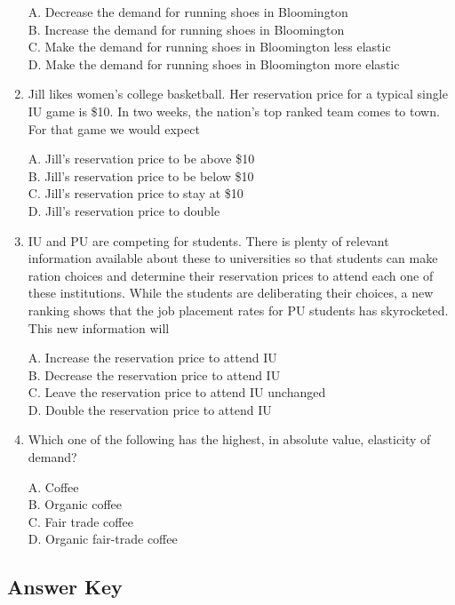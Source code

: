 \documentclass[
]{book}
\begin{document}
\begin{enumerate}
  A. Decrease the demand for running shoes in Bloomington\\
  B. Increase the demand for running shoes in Bloomington\\
  C. Make the demand for running shoes in Bloomington less elastic\\
  D. Make the demand for running shoes in Bloomington more elastic
\item
  Jill likes women's college basketball. Her reservation price for a typical single IU game is \$10. In two weeks, the nation's top ranked team comes to town. For that game we would expect

  A. Jill's reservation price to be above \$10\\
  B. Jill's reservation price to be below \$10\\
  C. Jill's reservation price to stay at \$10\\
  D. Jill's reservation price to double
\item
  IU and PU are competing for students. There is plenty of relevant information available about these to universities so that students can make ration choices and determine their reservation prices to attend each one of these institutions. While the students are deliberating their choices, a new ranking shows that the job placement rates for PU students has skyrocketed. This new information will

  A. Increase the reservation price to attend IU\\
  B. Decrease the reservation price to attend IU\\
  C. Leave the reservation price to attend IU unchanged\\
  D. Double the reservation price to attend IU
\item
  Which one of the following has the highest, in absolute value, elasticity of demand?

  A. Coffee\\
  B. Organic coffee\\
  C. Fair trade coffee\\
  D. Organic fair-trade coffee
\end{enumerate}

\hypertarget{answer-key-3}{%
\subsection{Answer Key}\label{answer-key-3}}
\end{document}
